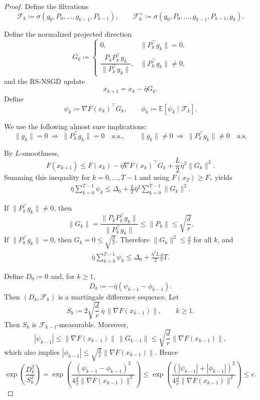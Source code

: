 \documentclass[10pt]{article}
\begin{document}
\begin{proof}
Define the filtrations
\[
\mathcal{F}_k \coloneqq \sigma(g_0,P_0,\ldots,g_{k-1},P_{k-1}),
\qquad
\mathcal{F}_k^+ \coloneqq \sigma(g_0,P_0,\ldots,g_{k-1},P_{k-1},g_k).
\]

Define the normalized projected direction
\[
G_k \coloneqq
\begin{cases}
0, & \|P_k^\top g_k\|=0,\\[2mm]
\dfrac{P_kP_k^\top g_k}{\|P_k^\top g_k\|}, & \|P_k^\top g_k\|\neq 0,
\end{cases}
\]
and the RS-NSGD update
\[
x_{k+1} = x_k - \bar{\eta} G_k.
\]
Define
\[
\psi_k \coloneqq \nabla F(x_k)^\top G_k,
\qquad
\phi_k \coloneqq \mathbb{E}[\psi_k\mid\mathcal{F}_k].
\]

We use the following almost sure implications:
\[
\|g_k\|=0 \ \Rightarrow\ \|P_k^\top g_k\|=0 \quad \text{a.s.},
\qquad
\|g_k\|\neq 0 \ \Rightarrow\ \|P_k^\top g_k\|\neq 0 \quad \text{a.s.}
\]

By $L$-smoothness,
\[
F(x_{k+1})
\le
F(x_k)
-\bar{\eta}\nabla F(x_k)^\top G_k
+\frac{L}{2}\bar{\eta}^2\|G_k\|^2.
\]
Summing this inequality for $k=0,\ldots,T-1$ and using $F(x_T)\ge F_*$ yields
\begin{align}
\bar{\eta}\sum_{k=0}^{T-1}\psi_k
\le
\Delta_0
+
\frac{L}{2}\bar{\eta}^2\sum_{k=0}^{T-1}\|G_k\|^2.
\label{eq:descent-basic}
\end{align}


If $\|P_k^\top g_k\|\neq 0$, then
\[
\|G_k\|
=
\frac{\|P_kP_k^\top g_k\|}{\|P_k^\top g_k\|}
\le
\|P_k\|
\le
\sqrt{\frac{d}{r}}.
\]
If $\|P_k^\top g_k\|=0$, then $G_k=0 \leq \sqrt{\frac{d}{r}}$.
Therefore $\|G_k\|^2\le \frac{d}{r}$ for all $k$, and
\begin{align}
\bar{\eta}\sum_{k=0}^{T-1}\psi_k
\le
\Delta_0
+
\frac{\bar{\eta}^2L}{2}\frac{d}{r}T.
\label{eq:descent-NSGD}
\end{align}

Define $D_0\coloneqq 0$ and, for $k\ge1$,
\[
D_k \coloneqq -\bar{\eta}(\psi_{k-1}-\phi_{k-1}).
\]
Then $(D_k,\mathcal{F}_k)$ is a martingale difference sequence.
Let
\[
S_k \coloneqq 2\sqrt{\frac{d}{r}}\,\bar{\eta}\,\|\nabla F(x_{k-1})\|,
\qquad k\ge1.
\]
Then $S_k$ is $\mathcal{F}_{k-1}$-measurable. Moreover,
\[
|\psi_{k-1}|
\le
\|\nabla F(x_{k-1})\|\,\|G_{k-1}\|
\le
\sqrt{\frac{d}{r}}\|\nabla F(x_{k-1})\|,
\]
which also implies
$|\phi_{k-1}|\le \sqrt{\frac{d}{r}}\|\nabla F(x_{k-1})\|$.
Hence
\[
\exp\!\left(\frac{D_k^2}{S_k^2}\right)
=
\exp\!\left(
\frac{(\psi_{k-1}-\phi_{k-1})^2}
{4\frac{d}{r}\|\nabla F(x_{k-1})\|^2}
\right)
\le
\exp\!\left(
\frac{(|\psi_{k-1}|+|\phi_{k-1}|)^2}
{4\frac{d}{r}\|\nabla F(x_{k-1})\|^2}
\right)
\le
e.
\]




\end{proof}
\end{document}
